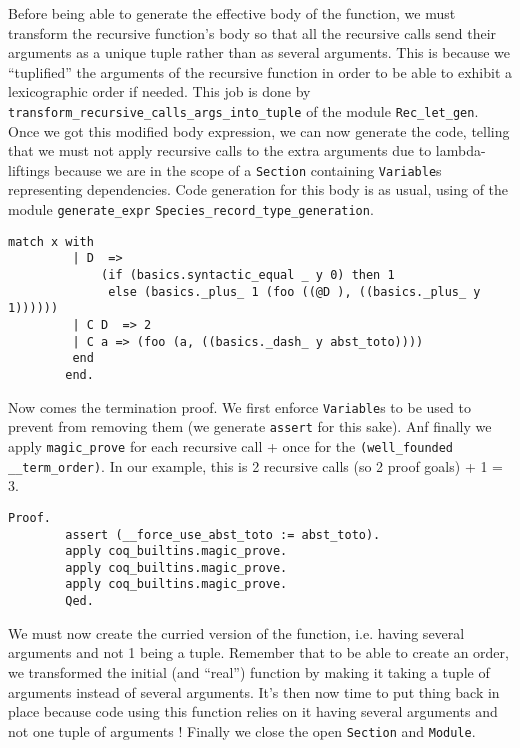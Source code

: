 Before being able to generate the effective body of the function, we
must transform the recursive function's body so that all the recursive
calls send their arguments as a unique tuple rather than as several
arguments. This is because we ``tuplified'' the arguments of the
recursive function in order to be able to exhibit a lexicographic
order if needed. This job is done by
{\tt transform\_recursive\_calls\_args\_into\_tuple} of the module
{\tt Rec\_let\_gen}. Once we got this modified body expression, we can
now generate the code, telling that we must not apply recursive calls to the extra
arguments due to lambda-liftings because we are in the scope of a {\tt Section}
containing {\tt Variable}s representing dependencies. Code generation
for this body is as usual, using of the module {\tt generate\_expr}
{\tt Species\_record\_type\_generation}.

{\footnotesize
\begin{lstlisting}[language=MyCoq]
        match x with
         | D  =>
             (if (basics.syntactic_equal _ y 0) then 1
              else (basics._plus_ 1 (foo ((@D ), ((basics._plus_ y 1))))))
         | C D  => 2
         | C a => (foo (a, ((basics._dash_ y abst_toto))))
         end
        end.
\end{lstlisting}
}

Now comes the termination proof. We first enforce {\tt Variable}s to
be used to prevent \coq from removing them (we generate {\tt assert}
for this sake).
Anf finally we apply {\tt magic\_prove} for each recursive call + once
for the {\tt (well\_founded \_\_term\_order)}. In our example, this is
2 recursive calls (so 2 proof goals) + 1 = 3.

{\footnotesize
\begin{lstlisting}[language=MyCoq]
      Proof.
        assert (__force_use_abst_toto := abst_toto).
        apply coq_builtins.magic_prove.
        apply coq_builtins.magic_prove.
        apply coq_builtins.magic_prove.
        Qed.
\end{lstlisting}
}

We must now create the curried version of the function, i.e. having
several arguments and not 1 being a tuple. Remember that to be able to
create an order, we transformed the initial (and ``real'') function by
making it taking a tuple of arguments instead of several
arguments. It's then now time to put thing back in place because code
using this function relies on it having several arguments and not one
tuple of arguments ! Finally we close the open {\tt Section} and {\tt Module}.

